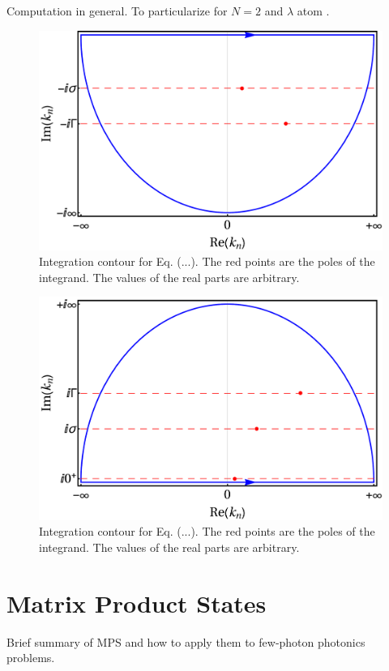 \documentclass[aps,pra,reprint,amsmath,amssymb]{revtex4-1}
\begin{document}
Computation in general. To particularize for $N=2$ and $\lambda$ atom \cite{Xu2016}.

\begin{figure}[tbh!]
\includegraphics[scale=0.25]{lower_contour.pdf}
\caption{Integration contour for Eq. (...). The red points are the poles of the
integrand. The values of the real parts are arbitrary.}
\end{figure}

\begin{figure}[tbh!]
\includegraphics[scale=0.25]{upper_contour.pdf}
\caption{Integration contour for Eq. (...). The red points are the poles of the
integrand. The values of the real parts are arbitrary.}
\end{figure}


\section{Matrix Product States}

Brief summary of MPS and how to apply them to few-photon photonics problems.



\end{document}
